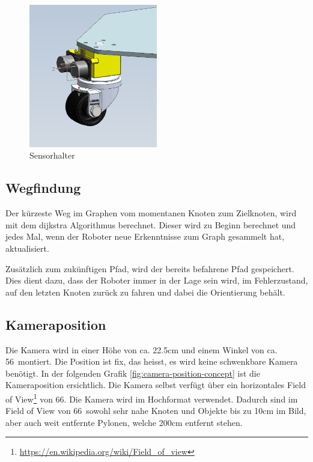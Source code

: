 \begin{figure}[H]
\centering
\includegraphics[width=0.5\textwidth]{assets/prototyp-fahrwerk/Prototyp_Sensorhalter.png}
\caption{Sensorhalter}
\label{fig:Prototype_Sensorhalter}
\end{figure}



\subsection{Wegfindung}

Der kürzeste Weg im Graphen vom momentanen Knoten zum Zielknoten, wird mit dem \gls{dijkstra} Algorithmus berechnet. Dieser wird zu Beginn berechnet und jedes Mal, wenn der Roboter neue Erkenntnisse zum Graph gesammelt hat, aktualisiert. 

Zusätzlich zum zukünftigen Pfad, wird der bereits befahrene Pfad gespeichert. Dies dient dazu, dass der Roboter immer in der Lage sein wird, im Fehlerzustand, auf den letzten Knoten zurück zu fahren und dabei die Orientierung behält.

\subsection{Kameraposition}

Die Kamera wird in einer Höhe von ca. 22.5cm und einem Winkel von ca. 56\textdegree\ montiert. Die Position ist fix, das heisst, es wird keine schwenkbare Kamera benötigt. In der folgenden Grafik \ref{fig:camera-position-concept} ist die Kameraposition ersichtlich. Die Kamera selbst verfügt über ein horizontales Field of View\footnote{\url{https://en.wikipedia.org/wiki/Field_of_view}} von 66\textdegree. Die Kamera wird im Hochformat verwendet. Dadurch sind im Field of View von 66\textdegree\ sowohl sehr nahe Knoten und Objekte bis zu 10cm im Bild, aber auch weit entfernte Pylonen, welche 200cm entfernt stehen.

